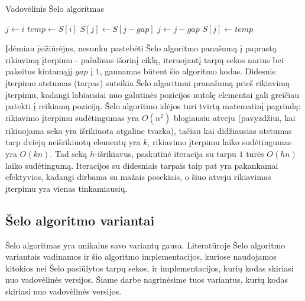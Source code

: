 \documentclass{VUMIFInfKursinis}
\begin{document}
\begin{algorithm}[H]
  \caption{Vadovėlinis Šelo algoritmas}\label{alg:tss}
  \begin{algorithmic}[1]
      \State $j\gets i$
      \State $temp\gets S[i]$\label{alg:tss:assign1}
      \label{alg:tss:while:start}
        \State $S[j]\gets S[j - gap]$
        \State $j\gets j-gap$
      \EndWhile\label{alg:tss:while:end}
      \State $S[j]\gets temp$\label{alg:tss:assign2}
    \EndFor
  \EndFor
  \end{algorithmic}
\end{algorithm}

Įdėmiau įsižiūrėjus, nesunku pastebėti Šelo algoritmo panašumą į paprastą rikiavimą įterpimu - pašalinus išorinį ciklą, iteruojantį tarpų sekos narius bei pakeitus
kintamąjį $gap$ į $1$, gaunamas būtent šio algoritmo kodas.
Didesnis įterpimo atstumas (tarpas) suteikia Šelo algoritmui pranašumą prieš rikiavimą įterpimu, kadangi labiausiai nuo galutinės pozicijos nutolę elementai gali greičiau patekti į reikiamą poziciją.
Šelo algoritmo idėjos turi tvirtą matematinį pagrindą: rikiavimo įterpimu sudėtingumas yra $O(n^2)$ blogiausiu atveju (pavyzdžiui, kai rikiuojama seka yra išrikiuota atgaline tvarka),
tačiau kai didžiausias atstumas tarp dviejų neišrikiuotų elementų yra $k$, rikiavimo įterpimu laiko sudėtingumas yra $O(kn)$.
Tad seką $h$-išrikiavus, paskutinė iteracija su tarpu $1$ turės $O(hn)$ laiko sudėtingumą.
Iteracijos su didesniais tarpais taip pat yra pakankamai efektyvios, kadangi dirbama su mažais posekiais,
o šiuo atveju rikiavimas įterpimu yra vienas tinkamiausių.

\subsection{Šelo algoritmo variantai}

Šelo algoritmas yra unikalus savo variantų gausa.
Literatūroje Šelo algoritmo variantais vadinamos ir šio algoritmo implementacijos, kuriose naudojamos
kitokios nei Šelo pasiūlytos tarpų sekos, ir implementacijos, kurių kodas skiriasi nuo vadovėlinės versijos.  
Šiame darbe nagrinėsime tuos variantus, kurių kodas skiriasi nuo vadovėlinės versijos.
\end{document}
